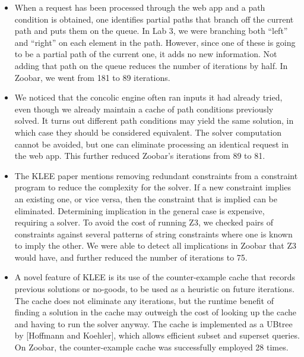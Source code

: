 \documentclass{scrartcl}
\begin{document}
\begin{itemize}
\item When a request has been processed through the web app and a path
  condition is obtained, one identifies partial paths that branch off the
  current path and puts them on the queue. In Lab 3, we were branching
  both ``left'' and ``right'' on each element in the path. However, since
  one of these is going to be a partial path of the current one, it adds
  no new information. Not adding that path on the queue reduces the number
  of iterations by half. In Zoobar, we went from 181 to 89 iterations.

\item We noticed that the concolic engine often ran inputs it had
  already tried, even though we already maintain a cache of path
  conditions previously solved. It turns out different path conditions
  may yield the same solution, in which case they should be considered
  equivalent. The solver computation cannot be avoided, but one can
  eliminate processing an identical request in the web app. This further
  reduced Zoobar's iterations from 89 to 81.

\item The KLEE paper mentions removing redundant constraints from a
  constraint program to reduce the complexity for the solver. If a new
  constraint implies an existing one, or vice versa, then the constraint
  that is implied can be eliminated.
  Determining implication in the general case is expensive, requiring a
  solver. To avoid the cost of running Z3, we checked pairs of constraints
  against several patterns of string constraints where one is known to
  imply the other. We were able to detect all implications in Zoobar that
  Z3 would have, and further reduced the number of iterations to 75.

\item A novel feature of KLEE is its use of the counter-example cache
  that records previous solutions or no-goods, to be used as a heuristic
  on future iterations. The cache does not eliminate any iterations, but
  the runtime benefit of finding a solution in the cache may outweigh the
  cost of looking up the cache and having to run the solver anyway.
  The cache is implemented as a UBtree by [Hoffmann and Koehler],
  which allows efficient subset and superset queries. On Zoobar, the
  counter-example cache was successfully employed 28 times.
\end{itemize}
\end{document}
